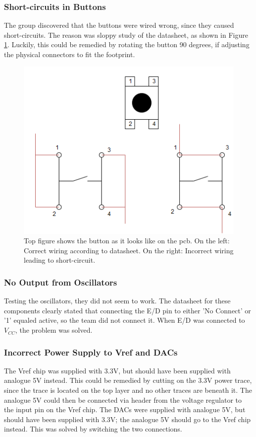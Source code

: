 \subsubsection{Short-circuits in Buttons}
The group discovered that the buttons were wired wrong, since they caused short-circuits.
The reason was sloppy study of the datasheet, as shown in Figure \ref{fig:Button Issue}.
Luckily, this could be remedied by rotating the button 90 degrees, if adjusting the physical connectors to fit the footprint.

\begin{figure}[h!]
\centering
\includegraphics[scale=0.5]{images/Button_Issue.png}
\caption{Top figure shows the button as it looks like on the \gls{pcb}. On the left: Correct wiring according to datasheet. On the right: Incorrect wiring leading to short-circuit.}
\label{fig:Button Issue}
\end{figure}

\subsubsection{No Output from Oscillators}
Testing the oscillators, they did not seem to work.
The datasheet for these components clearly stated that connecting the E/D pin to either 'No Connect' or '1' equaled active, so the team did not connect it.
When E/D was connected to \(V_{CC}\), the problem was solved.

\subsubsection{Incorrect Power Supply to Vref and DACs}
The Vref chip was supplied with 3.3V, but should have been supplied with analogue 5V instead.
This could be remedied by cutting on the 3.3V power trace, since the trace is located on the top layer and no other traces are beneath it.
The analogue 5V could then be connected via header from the voltage regulator to the input pin on the Vref chip.
\newline
The DACs were supplied with analogue 5V, but should have been supplied with 3.3V; the analogue 5V should go to the Vref chip instead.
This was solved by switching the two connections.


